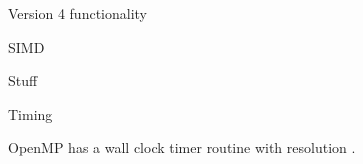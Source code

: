\begin{comment}
\Level 1 {Tree traversal}

Pre-order traversal while duplicating nodes and edges can make a
complete duplicate of a binary tree. It can also be used to make a
prefix expression (Polish notation) from expression trees: traverse
the expression tree pre-orderly.

In-order traversal is very commonly used on binary search trees
because it returns values from the underlying set in order, according
to the comparator that set up the binary search tree (hence the name).

Post-order traversal while deleting or freeing nodes and values can
delete or free an entire binary tree. It can also generate a postfix
representation of a binary tree.

If you know you need to explore the roots before inspecting any
leaves, you pick pre-order because you will encounter all the roots
before all of the leaves.

If you know you need to explore all the leaves before any nodes, you
select post-order because you don't waste any time inspecting roots in
search for leaves.

If you know that the tree has an inherent sequence in the nodes, and
you want to flatten the tree back into its original sequence, than an
in-order traversal should be used. The tree would be flattened in the
same way it was created. A pre-order or post-order traversal might not
unwind the tree back into the sequence which was used to create it.
\end{comment}

 {Version 4 functionality}

 {SIMD}



 {Stuff}

 {Timing}

OpenMP has a wall clock timer routine 
with resolution .

